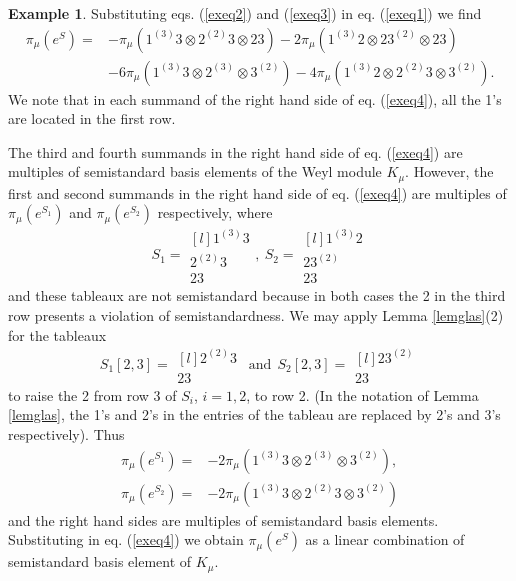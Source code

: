 \documentclass[11pt]{amsart}
\theoremstyle{definition}
\newtheorem{ex}[thm]{Example}
\numberwithin{equation}{section}
\begin{document}
\begin{ex}
		Substituting eqs. (\ref{exeq2}) and (\ref{exeq3}) in eq. (\ref{exeq1}) we find \begin{align}\label{exeq4}
		\pi_{\mu}(e^S)=&- \pi_{\mu}(1^{(3)}3 \otimes 2^{(2)}3 \otimes 23) -2 \pi_{\mu}(1^{(3)}2 \otimes 23^{(2)}  \otimes 23) \\\nonumber& - 6\pi_{\mu}(1^{(3)}3 \otimes 2^{(3)} \otimes 3^{(2)}) - 4 \pi_{\mu}(1^{(3)}2 \otimes 2^{(2)} 3 \otimes 3^{(2)}).
		\end{align}
		We note that in each summand of the right hand side of eq. (\ref{exeq4}), all the 1's are located in the first row.
		
		The third and fourth summands in the right hand side of eq. (\ref{exeq4}) are multiples of semistandard basis elements of the Weyl module $K_\mu$. However, the first and second summands in the right hand side of eq. (\ref{exeq4}) are multiples of $\pi_\mu(e^{S_1})$ and $\pi_\mu(e^{S_2})$ respectively, where \[S_1=\begin{matrix*}[l]
			1^{(3)}3 \\
			2^{(2)}3 \\
			23 \end{matrix*}, \ S_2 =\begin{matrix*}[l]
			1^{(3)}2 \\
			23^{(2)} \\
			23 \end{matrix*} \]
	and these tableaux are not semistandard because in both cases the 2 in the third row presents a violation of semistandardness. We may apply Lemma \ref{lemglas}(2) for the tableaux \[S_1[2,3]=\begin{matrix*}[l] 
		2^{(2)}3 \\
		23 \end{matrix*} \ \ \mathrm{and} \ \ S_2[2,3]=\begin{matrix*}[l] 
		23^{(2)} \\
		23 \end{matrix*} \]to raise the 2 from row 3 of $S_i$, $i=1,2$, to row 2. (In the notation of Lemma \ref{lemglas}, the 1's and 2's in the entries of the tableau are replaced by 2's and 3's respectively). Thus \begin{align*}\pi_\mu(e^{S_1})=&-2\pi_\mu(1^{(3)}3 \otimes 2^{(3)} \otimes 3^{(2)}), \\ \pi_\mu(e^{S_2})=&-2\pi_\mu(1^{(3)}3 \otimes 2^{(2)}3 \otimes 3^{(2)}) \end{align*}
	and the right hand sides are multiples of semistandard basis elements. Substituting in eq. (\ref{exeq4})	we obtain $\pi_\mu(e^S)$ as a linear combination of semistandard basis element of $K_\mu$. 
	\end{ex}
	
\end{document}

